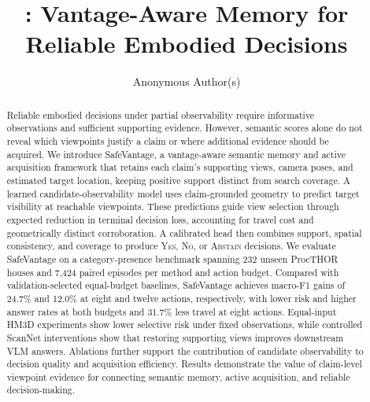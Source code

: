 \documentclass[letterpaper, 10 pt, conference]{ieeeconf}
\title{\LARGE \bf
    \method: Vantage-Aware Memory for Reliable Embodied Decisions
    }
\author{Anonymous Author(s)}
\newcommand{\method}{SafeVantage}
\begin{document}
    
    \maketitle
    \thispagestyle{empty}
    \pagestyle{empty}
    
    
\begin{abstract}
Reliable embodied decisions under partial observability require informative observations and sufficient supporting evidence. However, semantic scores alone do not reveal which viewpoints justify a claim or where additional evidence should be acquired. We introduce \method{}, a vantage-aware semantic memory and active acquisition framework that retains each claim's supporting views, camera poses, and estimated target location, keeping positive support distinct from search coverage. A learned candidate-observability model uses claim-grounded geometry to predict target visibility at reachable viewpoints. These predictions guide view selection through expected reduction in terminal decision loss, accounting for travel cost and geometrically distinct corroboration. A calibrated head then combines support, spatial consistency, and coverage to produce \textsc{Yes}, \textsc{No}, or \textsc{Abstain} decisions. We evaluate \method{} on a category-presence benchmark spanning 232 unseen ProcTHOR houses and 7,424 paired episodes per method and action budget. Compared with validation-selected equal-budget baselines, \method{} achieves macro-F1 gains of 24.7\% and 12.0\% at eight and twelve actions, respectively, with lower risk and higher answer rates at both budgets and 31.7\% less travel at eight actions. Equal-input HM3D experiments show lower selective risk under fixed observations, while controlled ScanNet interventions show that restoring supporting views improves downstream VLM answers. Ablations further support the contribution of candidate observability to decision quality and acquisition efficiency. Results demonstrate the value of claim-level viewpoint evidence for connecting semantic memory, active acquisition, and reliable decision-making.
\end{abstract}
    
    
\end{document}
